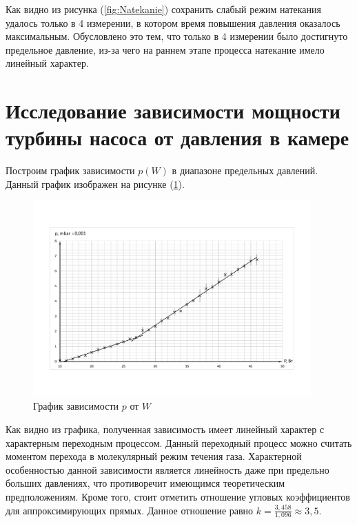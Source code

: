 \documentclass[12pt,a4paper]{article}
\begin{document}
	Как видно из рисунка (\ref{fig:Natekanie}) сохранить слабый режим натекания удалось только в 4 измерении, в котором время повышения давления оказалось максимальным. Обусловлено это тем, что только в 4 измерении было достигнуто предельное давление, из-за чего на раннем этапе процесса натекание имело линейный характер.
	
\section{Исследование зависимости мощности турбины насоса от давления в камере}

	Построим график зависимости $p(W)$ в диапазоне предельных давлений. Данный график изображен на рисунке (\ref{fig:Depence_preasure_of_power}).
	
	
	
	\begin{figure}[h!]
		\begin{center}
			\includegraphics[width = 0.95\textwidth]{Depence_preasure_of_power}
			\caption{График зависимости $p$ от $W$}
			\label{fig:Depence_preasure_of_power}
		\end{center}
	\end{figure}
	
	Как видно из графика, полученная зависимость имеет линейный характер с характерным переходным процессом. Данный переходный процесс можно считать моментом перехода в молекулярный режим течения газа. Характерной особенностью данной зависимости является линейность даже при предельно больших давлениях, что противоречит имеющимся теоретическим предположениям. Кроме того, стоит отметить отношение угловых коэффициентов для аппроксимирующих прямых. Данное отношение равно $k = \frac{3,458}{1,096} \approx 3,5$.
	
\end{document}
